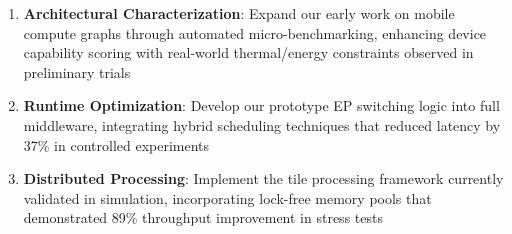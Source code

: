 \documentclass[conference]{IEEEtran}
\begin{document}
\begin{enumerate}
\item \textbf{Architectural Characterization}: Expand our early work on mobile compute graphs through automated micro-benchmarking, enhancing device capability scoring with real-world thermal/energy constraints observed in preliminary trials

\item \textbf{Runtime Optimization}: Develop our prototype EP switching logic into full middleware, integrating hybrid scheduling techniques that reduced latency by 37\% in controlled experiments

\item \textbf{Distributed Processing}: Implement the tile processing framework currently validated in simulation, incorporating lock-free memory pools that demonstrated 89\% throughput improvement in stress tests
\end{enumerate}

\end{document}
